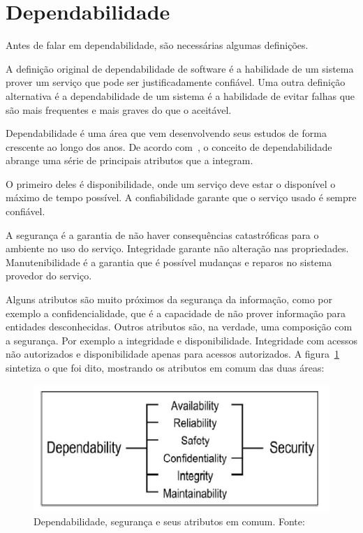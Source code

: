 \section{Dependabilidade}

Antes de falar em dependabilidade, são necessárias algumas definições.

A definição original de dependabilidade de software é a habilidade de um sistema prover um serviço que pode ser justificadamente confiável. Uma outra definição alternativa é a dependabilidade de um sistema é a habilidade de evitar falhas que são mais frequentes e mais graves do que o aceitável.

Dependabilidade é uma área que vem desenvolvendo seus estudos de forma crescente ao longo dos anos. De acordo com~\cite{algirdas04}, o conceito de dependabilidade abrange uma série de principais atributos que a integram.

O primeiro deles é disponibilidade, onde um serviço deve estar o disponível o máximo de tempo possível. A confiabilidade garante que o serviço usado é sempre confiável.

A segurança é a garantia de não haver consequências catastróficas para o ambiente no uso do serviço. Integridade garante não alteração nas propriedades. Manutenibilidade é a garantia que é possível mudanças e reparos no sistema provedor do serviço.

Alguns atributos são muito próximos da segurança da informação, como por exemplo a confidencialidade, que é a capacidade de não prover informação para entidades desconhecidas. Outros atributos são, na verdade, uma composição com a segurança. Por exemplo a integridade e disponibilidade. Integridade com acessos não autorizados e disponibilidade apenas para acessos autorizados. A figura~\ref{fig:dependabilidade-seguranca} sintetiza o que foi dito, mostrando os atributos em comum das duas áreas:

\begin{figure}
	\centering
	\includegraphics[scale=0.75]{images/dependabilidade-seguranca.png}
	\caption{Dependabilidade, segurança e seus atributos em comum. Fonte:~\cite{algirdas04}}
	\label{fig:dependabilidade-seguranca}
\end{figure}

